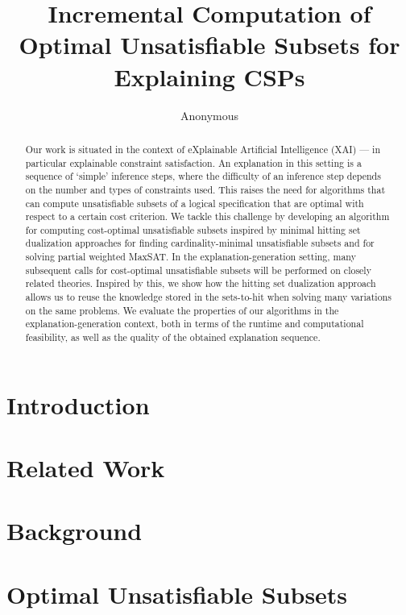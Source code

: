 \documentclass[letterpaper]{article} %
\title{Incremental Computation of Optimal Unsatisfiable Subsets for Explaining CSPs}
\author{Anonymous}
\newcommand\comment[1]{\marginpar{\tiny #1}}
\renewcommand\comment[1]{#1}
\newcommand{\todo}[1]{{\comment{\color{red}\textsc{TODO:}#1} }}
\begin{document}
\maketitle

\begin{abstract}
Our work is situated in the context of eXplainable Artificial Intelligence (XAI) --- in particular explainable constraint satisfaction.
An explanation in this setting is a sequence of `simple' inference steps, where the difficulty of an inference step depends on the number and types of constraints used.
This raises the need for algorithms that can compute unsatisfiable subsets of a logical specification that are optimal with respect to a certain cost criterion.
We tackle this challenge by developing an algorithm for computing cost-optimal unsatisfiable subsets inspired by minimal hitting set dualization approaches for finding cardinality-minimal unsatisfiable subsets and for solving partial weighted MaxSAT.
In the explanation-generation setting, many subsequent calls for cost-optimal unsatisfiable subsets will be performed on closely related theories.
Inspired by this, we show how the hitting set dualization approach allows us to reuse the knowledge stored in the sets-to-hit when solving many variations on the same problems.
We evaluate the properties of our algorithms in the explanation-generation context, both in terms of the runtime and computational feasibility, as well as the quality of the obtained explanation sequence.


\end{abstract}

\section{Introduction}

\section{Related Work}\label{sec:related}

\section{Background}\label{sec:backgr}\label{sec:background}


\section{Optimal Unsatisfiable Subsets}\label{sec:omus}

\end{document}
